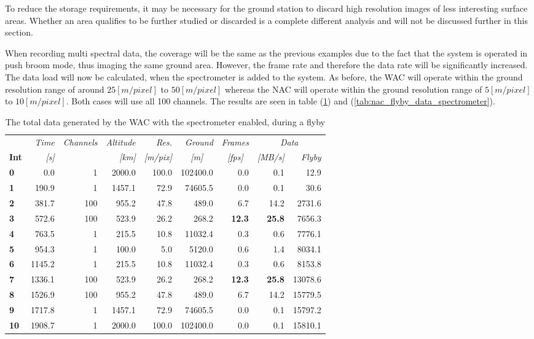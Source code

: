 To reduce the storage requirements, it may be necessary for the ground station to discard high resolution images of less interesting surface areas. Whether an area qualifies to be further studied or discarded is a complete different analysis and will not be discussed further in this section.

When recording multi spectral data, the coverage will be the same as the previous examples due to the fact that the system is operated in push broom mode, thus imaging the same ground area. However, the frame rate and therefore the data rate will be significantly increased. The data load will now be calculated, when the spectrometer is added to the system. As before, the WAC will operate within the ground resolution range of around $25[m/pixel]$ to $50[m/pixel]$ whereas the NAC will operate within the ground resolution range of $5[m/pixel]$ to $10[m/pixel]$. Both cases will use all 100 channels. The results are seen in table (\ref{tab:wac_flyby_data_spectrometer}) and (\ref{tab:nac_flyby_data_spectrometer}).
\begin{table}[h!]
  \centering
    \begin{tabular}{l|r|r|r|r|r|r|r|r|}
      & \textit{Time} & \textit{Channels} & \textit{Altitude} & \textit{Res.} & \textit{Ground} & \textit{Frames } & \multicolumn{2}{c}{\textit{Data}} \\
\textbf{Int} & \textit{[s]} & \textit{} & \textit{[km]} & \textit{[m/pix]} & \multicolumn{1}{c|}{\textit{[m]}} & \multicolumn{1}{c|}{\textit{[fps]}} & \textit{[MB/s]} & \multicolumn{1}{r}{\textit{Flyby}} \bigstrut[b]\\
\hline
\textbf{0} & 0.0   & 1     & 2000.0 & 100.0 & 102400.0 & 0.0   & 0.1   & 12.9 \bigstrut[t]\\
\textbf{1} & 190.9 & 1     & 1457.1 & 72.9  & 74605.5 & 0.0   & 0.1   & 30.6 \\
\textbf{2} & 381.7 & 100   & 955.2 & 47.8  & 489.0 & 6.7   & 14.2  & 2731.6 \\
\textbf{3} & 572.6 & 100   & 523.9 & 26.2  & 268.2 & \textbf{12.3} & \textbf{25.8} & 7656.3 \\
\textbf{4} & 763.5 & 1     & 215.5 & 10.8  & 11032.4 & 0.3   & 0.6   & 7776.1 \\
\textbf{5} & 954.3 & 1     & 100.0 & 5.0   & 5120.0 & 0.6   & 1.4   & 8034.1 \\
\textbf{6} & 1145.2 & 1     & 215.5 & 10.8  & 11032.4 & 0.3   & 0.6   & 8153.8 \\
\textbf{7} & 1336.1 & 100   & 523.9 & 26.2  & 268.2 & \textbf{12.3} & \textbf{25.8} & 13078.6 \\
\textbf{8} & 1526.9 & 100   & 955.2 & 47.8  & 489.0 & 6.7   & 14.2  & 15779.5 \\
\textbf{9} & 1717.8 & 1     & 1457.1 & 72.9  & 74605.5 & 0.0   & 0.1   & 15797.2 \\
\textbf{10} & 1908.7 & 1     & 2000.0 & 100.0 & 102400.0 & 0.0   & 0.1   & 15810.1 \\
\end{tabular}%
  \caption{The total data generated by the WAC with the spectrometer enabled, during a flyby}
  \label{tab:wac_flyby_data_spectrometer}%
\end{table}%
